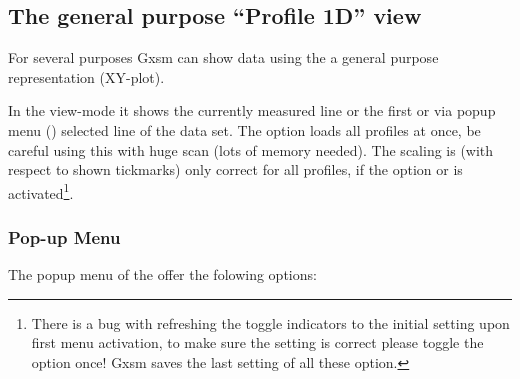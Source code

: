 




\clearpage

\subsection{The general purpose ``Profile 1D'' view}
\label{Gxsm-Profile}
For several purposes Gxsm can show data using the a general purpose
 representation (XY-plot).




In the view-mode  it shows the currently measured
line or the first or via popup menu ()
selected line of the data set.
The  option loads all profiles at once, be careful using
this with huge scan (lots of memory needed). The scaling is (with
respect to shown tickmarks) only correct for all profiles, if the
option  or 
is activated\footnote{There is a bug with refreshing the toggle
  indicators to the initial setting upon first menu activation, to
  make sure the setting is correct please toggle the option once! Gxsm
  saves the last setting of all these option.}.


\subsubsection{Pop-up Menu}

The popup menu of the  offer the folowing options:

